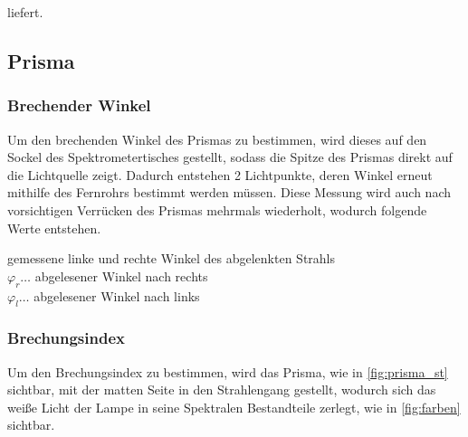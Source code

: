 \documentclass[11pt,ngerman]{scrartcl}
\begin{document}
liefert.

\newpage

\subsection{Prisma}

\subsubsection{Brechender Winkel}

Um den brechenden Winkel des Prismas zu bestimmen, wird dieses auf den Sockel
des Spektrometertisches gestellt, sodass die Spitze des Prismas direkt auf die
Lichtquelle zeigt. Dadurch entstehen 2 Lichtpunkte, deren Winkel erneut
mithilfe des Fernrohrs bestimmt werden müssen. Diese Messung wird auch nach
vorsichtigen Verrücken des Prismas mehrmals wiederholt, wodurch folgende Werte
entstehen.

\begin{table}[H]
	\caption{gemessene linke und rechte Winkel des abgelenkten Strahls\\ $\varphi_r \dots$ abgelesener Winkel nach rechts \\ $\varphi_l \dots$ abgelesener Winkel nach links}
	\label{tab:messgamma}
	\centering
	
\end{table}


\subsubsection{Brechungsindex}

Um den Brechungsindex zu bestimmen, wird das Prisma, wie in
\autoref{fig:prisma_st} sichtbar, mit der matten Seite in den Strahlengang
gestellt, wodurch sich das weiße Licht der Lampe in seine Spektralen
Bestandteile zerlegt, wie in \autoref{fig:farben} sichtbar.

\vspace{2mm}
\end{document}
